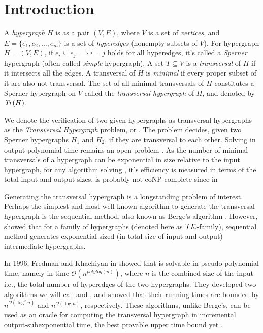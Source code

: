 \chapter{Introduction}

A \emph{hypergraph} $H$ is as a pair $(V,E)$, where $V$ is a set of \emph{vertices}, and $E=\{e_1,e_2,\dots,e_m\}$ is a set of \emph{hyperedges} (nonempty subsets of $V$). For hypergraph $H=(V,E)$, if $e_i\subseteq e_j\implies i=j$ holds for all hyperedges, it's called a \emph{Sperner} hypergraph (often called \emph{simple} hypergraph). A set $T\subseteq V$ is a \emph{transversal} of $H$ if it intersects all the edges. A transversal of $H$ is \emph{minimal} if every proper subset of it are also not transversal. The set of all minimal transversals of $H$ constitutes a Sperner hypergraph on $V$ called the \emph{transversal hypergraph} of $H$, and denoted by $\mathit{Tr}(H)$.

We denote the verification of two given hypergraphs as transversal hypergraphs as the \emph{Transversal Hypergraph} problem, or \TransHyp. The problem decides, given two Sperner hypergraphs $H_1$ and $H_2$, if they are transversal to each other. Solving \TransHyp{} in output-polynomial time remains an open problem \cite{EMG08}. As the number of minimal transversals of a hypergraph can be exponential in size relative to the input hypergraph, for any algorithm solving \TransHyp, it's efficiency is measured in terms of the total input and output sizes. \TransHyp{} is probably not coNP-complete since in \cite{EGM03}

Generating the transversal hypergraph is a longstanding problem of interest. Perhaps the simplest and most well-known algorithm to generate the transversal hypergraph is the sequential method, also known as Berge's algorithm \cite{Ber87}. However, \cite{Tak08} showed that for a family of hypergraphs (denoted here as $\mathcal{TK}$-family), sequential method generates exponential sized (in total size of input and output) intermediate hypergraphs.

In 1996, Fredman and Khachiyan in \cite{FK96} showed that \TransHyp{} is solvable in pseudo-polynomial time, namely in time $\mathcal{O}(n^{polylog(n)})$, where $n$ is the combined size of the input i.e., the total number of hyperedges of the two hypergraphs. They developed two algorithms we will call \FKA{} and \FKB, and showed that their running times are bounded by $n^{\mathcal{O}(\log^2 n)}$ and $n^{\mathcal{O}(\log n)}$, respectively. These algorithms, unlike Berge's, can be used as an oracle for computing the transversal hypergraph in incremental output-subexponential time, the best provable upper time bound yet \cite{CKP20}.

